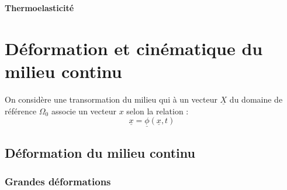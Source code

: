 \documentclass[11pt,a4paper]{article}
\begin{document}
\newcommand{\mathilde}[1]{\textbf{\textcolor{red}{#1}}}

\newcommand{\mat}[1]{\underline{\underline{#1}}}
\newcommand{\vct}[1]{\underline{#1}}

\newcommand{\accUN}[1]{\left\{\begin{array}{l}#1\end{array}\right.}
\newcommand{\accDEUX}[1]{\left\{\begin{array}{ll}#1\end{array}\right.}

\newcommand{\dive}{\textrm{div}}
\newcommand{\tr}{\textrm{tr}}
\newcommand{\grad}{\textrm{grad}}


\begin{center}
	\textbf{Thermoelasticité}
	
	\cite{SalenconMecaniquemilieuxcontinus2001,ForestMecaniquemilieuxcontinus2015,SidoroffMecaniquemilieuxcontinus1980}
\end{center}

\section{Déformation et cinématique du milieu continu}
On considère une transormation du milieu qui à un vecteur $\vct{X}$ du domaine de référence $\Omega_0$ associe un vecteur $x$ selon la relation :
\begin{equation}
\vct{x}=\vct{\phi}(\vct{x},t)
\end{equation}

\subsection{Déformation du milieu continu}

\subsubsection{Grandes déformations}
\end{document}
